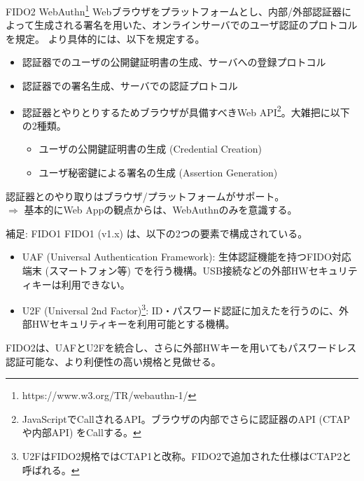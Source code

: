 \documentclass[12pt,dvipdfmx,uplatex]{beamer}
\begin{document}
\begin{frame}
\begin{block}{\small FIDO2 WebAuthn\footnote[frame]{\tiny https://www.w3.org/TR/webauthn-1/}}
\alert{Webブラウザをプラットフォームとし、内部/外部認証器によって生成される署名を用いた、オンラインサーバでのユーザ認証のプロトコル}を規定。
より具体的には、以下を規定する。
\begin{itemize}
 \item 認証器でのユーザの公開鍵証明書の生成、サーバへの登録プロトコル
 \item 認証器での署名生成、サーバでの認証プロトコル
 \item 認証器とやりとりするためブラウザが具備すべきWeb API\footnote[frame]{\tiny JavaScriptでCallされるAPI。ブラウザの内部でさらに認証器のAPI (CTAPや内部API) をCallする。}。大雑把に以下の2種類。
\begin{itemize}
 \item ユーザの公開鍵証明書の生成 (Credential Creation)
 \item ユーザ秘密鍵による署名の生成 (Assertion Generation)
\end{itemize}
\end{itemize}
\end{block}
認証器とのやり取りはブラウザ/プラットフォームがサポート。\\
$\Rightarrow$ 基本的にWeb Appの観点からは、WebAuthnのみを意識する。
\end{frame}


\begin{frame}
\begin{exampleblock}{\small 補足: FIDO1}
\small
FIDO1 (v1.x) は、以下の2つの要素で構成されている。
\begin{itemize}
 \item UAF (Universal Authentication Framework): 生体認証機能を持つFIDO対応端末 (スマートフォン等) でを行う機構。USB接続などの外部HWセキュリティキーは利用できない。
 \item U2F (Universal 2nd Factor)\footnote[frame]{\scriptsize U2FはFIDO2規格ではCTAP1と改称。FIDO2で追加された仕様はCTAP2と呼ばれる。}: ID・パスワード認証に加えたを行うのに、外部HWセキュリティキーを利用可能とする機構。
\end{itemize}
FIDO2は、UAFとU2Fを統合し、さらに外部HWキーを用いてもパスワードレス認証可能な、より利便性の高い規格と見做せる。
\end{exampleblock}
 
\end{frame}
\end{document}
